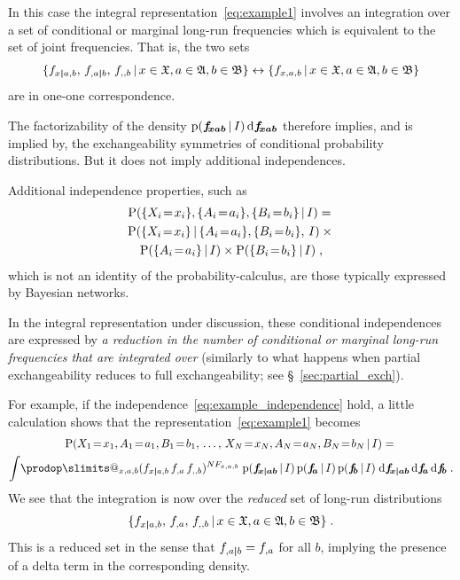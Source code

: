 \documentclass[\ifafour a4paper,12pt,\else a5paper,10pt,\fi%
onecolumn,oneside,article,%
british%
]{memoir}
\makeatletter
\theoremstyle{remark}
\theoremstyle{innote}
\def\prod{\DOTSI\prodop\slimits@}
\newcommand*{\di}{\mathrm{d}}%
\DeclarePairedDelimiter\set{\{}{\}}
\newcommand*{\pf}{\mathrm{p}}%
\newcommand*{\p}{\mathrm{P}}%
\renewcommand*{\|}[1][]{\nonscript\,#1\vert\nonscript\,\mathopen{}}
\newcommand*{\sect}{\S}%
\renewcommand*{\=}{\TextOrMath\texteq\eq}
\newcommand*{\X}[1]{X_{#1}}
\newcommand*{\x}[1]{x_{#1}}
\newcommand*{\A}[1]{A_{#1}}
\newcommand*{\va}[1]{a_{#1}}
\newcommand*{\B}[1]{B_{#1}}
\newcommand*{\vb}[1]{b_{#1}}
\newcommand*{\sX}{\mathfrak{X}}
\newcommand*{\sA}{\mathfrak{A}}
\newcommand*{\sB}{\mathfrak{B}}
\newcommand*{\ff}[1]{f_{#1}}
\newcommand*{\ffb}[1]{\bm{f_{\!#1}}}
\newcommand*{\FF}[1]{F_{#1}}
\newcommand*{\bcond}[1][]{\nonscript\,#1\bm{\vert}\nonscript\;\mathopen{}}
\makeatother
\begin{document}
In this case the integral representation~\eqref{eq:example1} involves an
integration over a set of conditional or marginal long-run frequencies
which is equivalent to the set of joint frequencies. That is, the two sets
\begin{equation}
  \label{eq:sets_corr}
  \set{\ff{x \bcond a,b},\, \ff{,a \bcond b},\, \ff{,,b} \|
 x \in \sX, a \in \sA, b \in \sB}
\leftrightarrow
\set{\ff{x,a,b} \| x \in \sX, a \in \sA, b \in \sB}
\end{equation}
are in one-one correspondence.

The factorizability of the density $\pf(\ffb{xab}\|I)\,\di\ffb{xab}$
therefore implies, and is implied by, the exchangeability symmetries of
conditional probability distributions. But it does not imply additional
independences.

Additional independence properties, such as
\begin{multline}
  \label{eq:example_independence}
  \p( \set{\X{i}\=\x{i}}, \set{\A{i}\=\va{i}}, \set{\B{i}\=\vb{i}} \| I)
={}\\
  \p( \set{\X{i}\=\x{i}} \| \set{\A{i}\=\va{i}}, \set{\B{i}\=\vb{i}},\, I)
  \times{}\\
  \p(\set{\A{i}\=\va{i}} \|  I)
  \times \p(  \set{\B{i}\=\vb{i}}\| I) \;,
\end{multline}
which is not an identity of the probability-calculus, are those typically
expressed by Bayesian networks.

In the integral representation under discussion, these conditional
independences are expressed by \emph{a reduction in the number of
  conditional or marginal long-run frequencies that are integrated over}
(similarly to what happens when partial exchangeability reduces to full
exchangeability; see \sect~\ref{sec:partial_exch}).

For example, if the independence~\eqref{eq:example_independence} hold, a
little calculation shows that the representation~\eqref{eq:example1} becomes
\begin{multline}
  \label{eq:example1sep}
  \p( \X{1}\=\x{1}, \A{1}\=\va{1}, \B{1}\=\vb{1},\, \dotsc,\,
   \X{N}\=\x{N}, \A{N}\=\va{N}, \B{N}\=\vb{N} \| I) ={}\\
     \int\!\prod_{x,a,b}
     (\ff{x \bcond a,b}\, \ff{,a}\, \ff{,,b})^{N \FF{x,a,b}}\;%
\pf(\ffb{x \bcond ab}\|I)\,\pf(\ffb{a}\|I)\,\pf(\ffb{b}\|I)
\;\di\ffb{x \bcond ab} \,\di\ffb{a} \,\di\ffb{b} \;.
\end{multline}
We see that the integration is now over the \emph{reduced} set of long-run
distributions
\begin{equation}
  \label{eq:subset_freqs}
  \set{\ff{x \bcond a,b},\, \ff{,a},\, \ff{,,b} \|
    x \in \sX, a \in \sA, b \in \sB} \;.
\end{equation}
This is a reduced set in the sense that $\ff{,a \bcond b} = \ff{,a}$ for
all $b$, implying the presence of a delta term in the corresponding
density.
\end{document}
